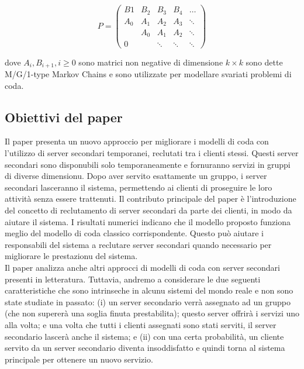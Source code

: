 \documentclass[11pt]{article}
\begin{document}
\begin{equation}
    P = \begin{pmatrix}
        B1 & B_2 & B_3 & B_4 & \ldots \\
        A_0 & A_1 & A_2 & A_3 & \ddots \\
            & A_0 & A_1 & A_2 & \ddots \\
        0   &     & \ddots & \ddots & \ddots
    \end{pmatrix}
\end{equation}

\noindent dove $A_i, B_{i+1}, i \geq 0$ sono matrici non negative di dimensione $k \times k$ sono dette M/G/1-type Markov Chains e sono utilizzate per modellare svariati problemi di coda.

\subsection{Obiettivi del paper}

\noindent Il paper presenta un nuovo approccio per migliorare i modelli di coda con l'utilizzo di server secondari temporanei, reclutati tra i clienti stessi. Questi server secondari sono disponubili solo temporaneamente e fornuranno servizi in gruppi di diverse dimensionu. Dopo aver servito esattamente un gruppo, i server secondari lasceranno il sistema, permettendo ai clienti di proseguire le loro attività senza essere trattenuti. Il contributo principale del paper è l'introduzione del concetto di reclutamento di server secondari da parte dei clienti, in modo da aiutare il sistema. I risultati numerici indicano che il modello proposto funziona meglio del modello di coda classico corrispondente. Questo può aiutare i responsabili del sistema a reclutare server secondari quando necessario per migliorare le prestazionu del sistema. \\

\noindent Il paper analizza anche altri approcci di modelli di coda con server secondari presenti in letteratura. Tuttavia, andremo a considerare le due seguenti caratteristiche che sono intrinseche in alcunu sistemi del mondo reale e non sono state studiate in passato: (i) un server secondario verrà assegnato ad un gruppo (che non supererà una soglia finuta prestabilita); questo server offrirà i servizi uno alla volta; e una volta che tutti i clienti assegnati sono stati serviti, il server secondario lascerà anche il sistema; e (ii) con una certa probabilità, un cliente servito da un server secondario diventa insoddisfatto e quindi torna al sistema principale per ottenere un nuovo servizio.
\end{document}
